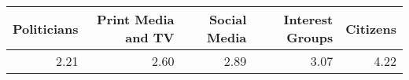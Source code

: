 \begin{tabular}{rrrrr}
  \toprule
Politicians & Print Media and TV & Social Media & Interest Groups & Citizens \\ 
  \midrule
2.21 & 2.60 & 2.89 & 3.07 & 4.22 \\ 
   \bottomrule
\end{tabular}
